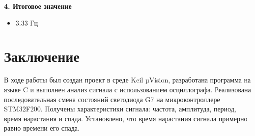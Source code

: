 \documentclass[a4paper, final]{article}
\begin{document}
\vspace{1em}

\textbf{4. Итоговое значение}
\begin{itemize}
    \item 3.33 Гц
\end{itemize}

\newpage

\section*{Заключение}

В ходе работы был создан проект в среде Keil µVision, разработана программа на языке C и выполнен анализ сигнала с использованием осциллографа. Реализована последовательная смена состояний светодиода G7 на микроконтроллере STM32F200. Получены характеристики сигнала: частота, амплитуда, период, время нарастания и спада. Установлено, что время нарастания сигнала примерно равно времени его спада.

\newpage
\end{document}

